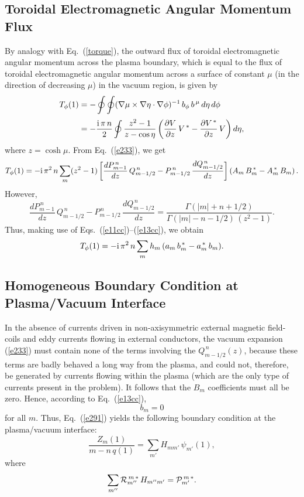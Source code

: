 \documentclass[12pt,prb,aps]{revtex4-1}
\begin{document}
\subsection{Toroidal Electromagnetic Angular Momentum Flux}
By analogy with Eq.~(\ref{torque}), the outward flux of toroidal electromagnetic angular momentum across the plasma boundary,
which is equal to the flux of  toroidal electromagnetic angular momentum across a surface of constant $\mu$ (in the direction of
decreasing $\mu$) in the vacuum region, is given by 
\begin{align}
T_\phi(1) &= -\oint\oint (\nabla\mu\times \nabla\eta\cdot\nabla\phi)^{-1}\,b_\phi\,b^{\,\mu}\,d\eta\,d\phi\nonumber\\[0.5ex]
&= -\frac{{\rm i}\,\pi\,n}{2}\oint \frac{z^2-1}{z-\cos\eta}\left(\frac{\partial V}{\partial z}\,V^{\,\ast}-\frac{\partial V^{\,\ast}}{\partial z}\,V\right)d\eta,
\end{align}
where $z=\cosh\mu$. 
From Eq.~(\ref{e233}), we get
\begin{equation}
T_\phi(1)=-{\rm i}\,\pi^2\,n\sum_m(z^2-1)\left[\frac{dP_{m-1}^{\,n}}{dz}\,Q_{m-1/2}^{\,n}- P_{m-1/2}^{\,n}\,\frac{dQ_{m-1/2}^{\,n}}{dz}\right]
\left(A_m\,B_m^{\,\ast}- A_m^{\,\ast}\,B_m\right).
\end{equation}
However,\cite{morse3}
\begin{equation}
\frac{dP_{m-1}^{\,n}}{dz}\,Q_{m-1/2}^{\,n}- P_{m-1/2}^{\,n}\,\frac{dQ_{m-1/2}^{\,n}}{dz}= \frac{\Gamma(|m|+n+1/2)}{\Gamma(|m|-n-1/2)\,(z^2-1)}.
\end{equation}
Thus, making use of Eqs.~(\ref{e11cc})--(\ref{e13cc}), we obtain
\begin{equation}\label{e90cc}
T_\phi(1) =- {\rm i}\,\pi^2\,n\sum_m h_m\,(a_m\,b_m^{\,\ast}-a_m^{\,\ast}\,b_m).
\end{equation}

\subsection{Homogeneous Boundary Condition at Plasma/Vacuum Interface}
In the absence of currents driven in non-axisymmetric external magnetic field-coils and  eddy currents flowing in external conductors, the vacuum expansion  (\ref{e233})
must contain none of the terms involving the $Q_{m-1/2}^{\,n}(z)$, because these terms are badly behaved a long way from the plasma,
and could not, therefore, be generated by currents flowing within the plasma (which are the only type of currents present in the problem).  It follows that the $B_m$ coefficients must all be zero. Hence, according to
Eq.~(\ref{e13cc}),
\begin{equation}\label{e296}
b_m= 0
\end{equation}
for all $m$. Thus, Eq.~(\ref{e291}) yields the following boundary condition at the plasma/vacuum interface:
\begin{equation}\label{e297}
\frac{Z_m(1) }{m-n\,q(1)}= \sum_{m'}H_{mm'}\,\psi_{m'}(1),
\end{equation}
where
\begin{equation}\label{e298}
\sum_{m''}{\cal R}_{m''}^{\,m\,\ast}\,H_{m'' m'}= {\cal P}_{m'}^{\,m\,\ast}.
\end{equation}
\end{document}
